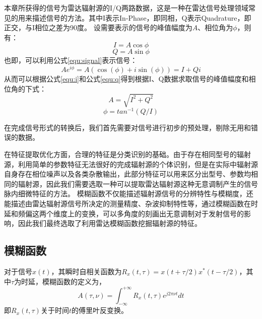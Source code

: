 本章所获得的信号为雷达辐射源的I/Q两路数据，这是一种在雷达信号处理领域常见的用来描述信号的方法。其中I表示In-Phase，即同相，Q表示Quadrature，即正交，与I相位之差为90度。
设需要表示的信号的峰值幅度为$A$、相位角为$\phi$，则有：
\begin{equation}
	I = A\cos{\phi}
	\label{equ:i}
\end{equation}
\begin{equation}
	Q = A\sin{\phi}
	\label{equ:q}
\end{equation}
也即，可以利用公式\ref{equ:signal}表示信号：
\begin{equation}
	Ae^{i\phi}=A(\cos(\phi) + i\sin(\phi))=I+Qi
	\label{equ:signal}
\end{equation}
从而可以根据公式\ref{equ:i}和公式\ref{equ:q}得到根据I、Q数据求取信号的峰值幅度和相位角的下式：
\begin{equation}
	A=\sqrt{I^2+Q^2}
\end{equation}
\begin{equation}
	\phi=tan^{-1}(Q/I)
\end{equation}

在完成信号形式的转换后，我们首先需要对信号进行初步的预处理，剔除无用和错误的数据。


在特征提取优化方面，合理的特征是分类识别的基础。由于存在相同型号的辐射源，利用简单的参数特征无法很好的完成辐射源的个体识别，但是在实际中辐射源自身存在相位噪声以及各类杂散输出，此部分特征可以用来区分出型号、参数均相同的辐射源，因此我们需要选取一种可以提取雷达辐射源这种无意调制产生的信号脉内细微特征的方法。
模糊函数不仅能描述辐射源信号的分辨特性与模糊度，还能描述由雷达辐射源信号所决定的测量精度、杂波抑制特性等，通过模糊函数在时延和频偏这两个维度上的变换，可以多角度的刻画出无意调制对于发射信号的影响，因此我们最终选取了利用雷达模糊函数挖掘辐射源的特征。

\subsection{模糊函数}
对于信号$x(t)$，其瞬时自相关函数为$R_x(t,\tau)=x(t+\tau/2)x^{*}(t-\tau/2)$，其中$\tau$为时延，模糊函数的定义为，
\begin{equation}
A(\tau,\nu) = \int_{-\infty}^{+\infty}R_x(t,\tau)e^{j2\pi\nu t}dt
\label{equ:defineaf}
\end{equation}
即$R_x(t,\tau)$关于时间$t$的傅里叶反变换。

